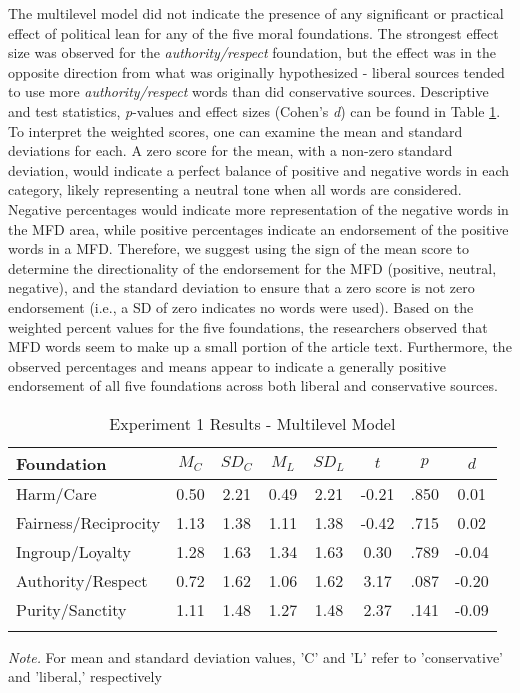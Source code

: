 \documentclass[english,,man]{apa6}
\begin{document}
The multilevel model did not indicate the presence of any significant or
practical effect of political lean for any of the five moral
foundations. The strongest effect size was observed for the
\emph{authority/respect} foundation, but the effect was in the opposite
direction from what was originally hypothesized - liberal sources tended
to use more \emph{authority/respect} words than did conservative
sources. Descriptive and test statistics, \emph{p}-values and effect
sizes (Cohen's \emph{d}) can be found in Table \ref{tab:exp1-table}. To
interpret the weighted scores, one can examine the mean and standard
deviations for each. A zero score for the mean, with a non-zero standard
deviation, would indicate a perfect balance of positive and negative
words in each category, likely representing a neutral tone when all
words are considered. Negative percentages would indicate more
representation of the negative words in the MFD area, while positive
percentages indicate an endorsement of the positive words in a MFD.
Therefore, we suggest using the sign of the mean score to determine the
directionality of the endorsement for the MFD (positive, neutral,
negative), and the standard deviation to ensure that a zero score is not
zero endorsement (i.e., a SD of zero indicates no words were used).
Based on the weighted percent values for the five foundations, the
researchers observed that MFD words seem to make up a small portion of
the article text. Furthermore, the observed percentages and means appear
to indicate a generally positive endorsement of all five foundations
across both liberal and conservative sources.

\begin{table}[tbp]
\begin{center}
\begin{threeparttable}
\caption{\label{tab:exp1-table}Experiment 1 Results - Multilevel Model}
\begin{tabular}{lccccccc}
\toprule
Foundation & $M_C$ & $SD_C$ & $M_L$ & $SD_L$ & $t$ & $p$ & $d$\\
\midrule
Harm/Care & 0.50 & 2.21 & 0.49 & 2.21 & -0.21 & .850 & 0.01\\
Fairness/Reciprocity & 1.13 & 1.38 & 1.11 & 1.38 & -0.42 & .715 & 0.02\\
Ingroup/Loyalty & 1.28 & 1.63 & 1.34 & 1.63 & 0.30 & .789 & -0.04\\
Authority/Respect & 0.72 & 1.62 & 1.06 & 1.62 & 3.17 & .087 & -0.20\\
Purity/Sanctity & 1.11 & 1.48 & 1.27 & 1.48 & 2.37 & .141 & -0.09\\
\bottomrule
\addlinespace
\end{tabular}
\begin{tablenotes}[para]
\normalsize{\textit{Note.} For mean and standard deviation values, 'C' and 'L' refer to 'conservative' and 'liberal,' respectively}
\end{tablenotes}
\end{threeparttable}
\end{center}
\end{table}
\end{document}

